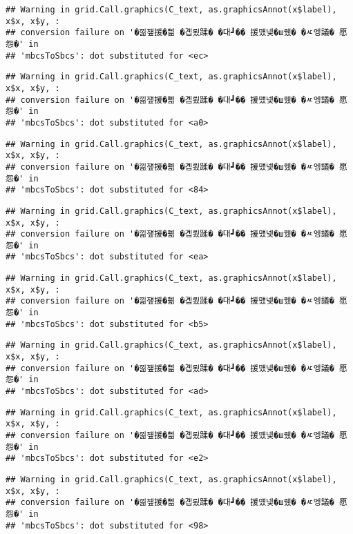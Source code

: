 \documentclass[
]{article}
\begin{document}
\begin{verbatim}
## Warning in grid.Call.graphics(C_text, as.graphicsAnnot(x$label), x$x, x$y, :
## conversion failure on '�낆쟾援�쁾 �곕룄蹂� �대┛�� 援먰넻�ш퀬� �ㅼ엥議� 愿怨�' in
## 'mbcsToSbcs': dot substituted for <ec>
\end{verbatim}

\begin{verbatim}
## Warning in grid.Call.graphics(C_text, as.graphicsAnnot(x$label), x$x, x$y, :
## conversion failure on '�낆쟾援�쁾 �곕룄蹂� �대┛�� 援먰넻�ш퀬� �ㅼ엥議� 愿怨�' in
## 'mbcsToSbcs': dot substituted for <a0>
\end{verbatim}

\begin{verbatim}
## Warning in grid.Call.graphics(C_text, as.graphicsAnnot(x$label), x$x, x$y, :
## conversion failure on '�낆쟾援�쁾 �곕룄蹂� �대┛�� 援먰넻�ш퀬� �ㅼ엥議� 愿怨�' in
## 'mbcsToSbcs': dot substituted for <84>
\end{verbatim}

\begin{verbatim}
## Warning in grid.Call.graphics(C_text, as.graphicsAnnot(x$label), x$x, x$y, :
## conversion failure on '�낆쟾援�쁾 �곕룄蹂� �대┛�� 援먰넻�ш퀬� �ㅼ엥議� 愿怨�' in
## 'mbcsToSbcs': dot substituted for <ea>
\end{verbatim}

\begin{verbatim}
## Warning in grid.Call.graphics(C_text, as.graphicsAnnot(x$label), x$x, x$y, :
## conversion failure on '�낆쟾援�쁾 �곕룄蹂� �대┛�� 援먰넻�ш퀬� �ㅼ엥議� 愿怨�' in
## 'mbcsToSbcs': dot substituted for <b5>
\end{verbatim}

\begin{verbatim}
## Warning in grid.Call.graphics(C_text, as.graphicsAnnot(x$label), x$x, x$y, :
## conversion failure on '�낆쟾援�쁾 �곕룄蹂� �대┛�� 援먰넻�ш퀬� �ㅼ엥議� 愿怨�' in
## 'mbcsToSbcs': dot substituted for <ad>
\end{verbatim}

\begin{verbatim}
## Warning in grid.Call.graphics(C_text, as.graphicsAnnot(x$label), x$x, x$y, :
## conversion failure on '�낆쟾援�쁾 �곕룄蹂� �대┛�� 援먰넻�ш퀬� �ㅼ엥議� 愿怨�' in
## 'mbcsToSbcs': dot substituted for <e2>
\end{verbatim}

\begin{verbatim}
## Warning in grid.Call.graphics(C_text, as.graphicsAnnot(x$label), x$x, x$y, :
## conversion failure on '�낆쟾援�쁾 �곕룄蹂� �대┛�� 援먰넻�ш퀬� �ㅼ엥議� 愿怨�' in
## 'mbcsToSbcs': dot substituted for <98>
\end{verbatim}
\end{document}
